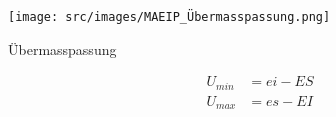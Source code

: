     \begin{minipage}{0.99\linewidth}
        \begin{minipage}{0.49\linewidth}
            \begin{center}
                \texttt{[image: src/images/MAEIP\_Übermasspassung.png]}
            \end{center}
        \end{minipage}
        \begin{minipage}{0.49\linewidth}
            Übermasspassung

            \begin{align*}
                U_{min} &= ei - ES\\
                U_{max} &= es - EI
            \end{align*}
        \end{minipage}
    \end{minipage}